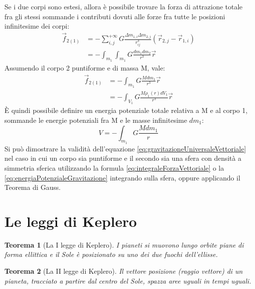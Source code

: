 \documentclass[11pt, a4paper, openright]{book}
\theoremstyle{plain}
\newtheorem{theorem}{Teorema}[section]
\theoremstyle{definition}
\begin{document}
Se i due corpi sono estesi, allora è possibile trovare la forza di attrazione totale fra gli stessi sommande i contributi dovuti alle forze fra tutte le posizioni infinitesime dei corpi:
\begin{align}
    \vec{f}_{2(1)} & =  -\sum_{i, j}^{+\infty} G \frac{\Delta m_{1,i} \Delta m_{2,j}}{r_{ij}^3}(\vec{r}_{2, j} - \vec{r}_{1, i}) \\
                   & = - \int_{m_1} \int_{m_1} G \frac{dm_1dm_2}{r^3}\vec{r}
\end{align}
Assumendo il corpo 2 puntiforme e di massa M, vale:
\begin{align}
    \vec{f}_{2(1)} & = - \int_{m_1} G \frac{Mdm_1}{r^3}\vec{r} \\
                   & = - \int_{V_1} G \frac{M\rho_1(r)dV_1}{r^3}\vec{r} 
                   \label{eq:integraleForzaVettoriale}
\end{align}
È quindi possibile definire un energia potenziale totale relativa a M e al corpo 1, sommande le energie potenziali fra M e le masse infinitesime $dm_1$:
\begin{equation}
    V = - \int_{m_1} G \frac{Mdm_1}{r}
    \label{eq:energiaPotenzialeGravitazione}
\end{equation}
Si può dimostrare la validità dell'equazione \ref{eq:gravitazioneUniversaleVettoriale} nel caso in cui un corpo sia puntiforme e il secondo sia una sfera con densità a simmetria sferica utilizzando la formula \ref{eq:integraleForzaVettoriale} o la \ref{eq:energiaPotenzialeGravitazione} integrando sulla sfera, oppure applicando il Teorema di Gauss.

\newpage

\section{Le leggi di Keplero}
\begin{theorem}[La I legge di Keplero]
    I pianeti si muovono lungo orbite piane di forma ellittica e il Sole è posizionato su uno dei due fuochi dell'ellisse.
\end{theorem}

\begin{theorem}[La II legge di Keplero]
    Il vettore posizione (raggio vettore) di un pianeta, tracciato a partire dal centro del Sole, spazza aree uguali in tempi uguali. 
\end{theorem}
\end{document}
